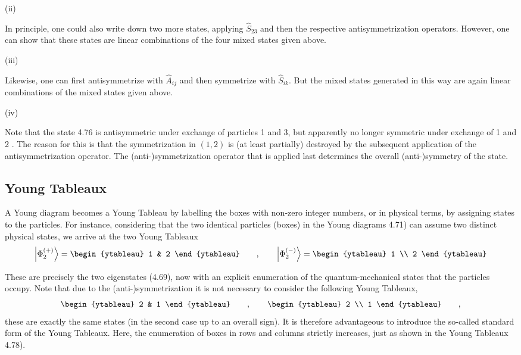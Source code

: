 \documentclass[10pt, letterpaper]{article}
\begin{document}
(ii) 

In principle, one could also write down two more states, applying $\hat{S}_{23}$ and then the respective antisymmetrization operators. However, one can show that these states are linear combinations of the four mixed states given above.


(iii) 

Likewise, one can first antisymmetrize with $\hat{A}_{i j}$ and then symmetrize with $\hat{S}_{i k}$. But the mixed states generated in this way are again linear combinations of the mixed states given above.

(iv) 

Note that the state 4.76 is antisymmetric under exchange of particles 1 and 3, but apparently no longer symmetric under exchange of 1 and 2 . The reason for this is that the symmetrization in $(1,2)$ is (at least partially) destroyed by the subsequent application of the antisymmetrization operator. The (anti-)symmetrization operator that is applied last determines the overall (anti-)symmetry of the state.




\subsection{Young Tableaux}
A Young diagram becomes a Young Tableau by labelling the boxes with non-zero integer numbers, or in physical terms, by assigning states to the particles. For instance, considering that the two identical particles (boxes) in the Young diagrams 4.71) can assume two distinct physical states, we arrive at the two Young Tableaux
\[
\left| \Phi_2^{(+)} \right\rangle =
\begin{ytableau}
1 & 2
\end{ytableau}
\qquad , \qquad
\left| \Phi_2^{(-)} \right\rangle =
\begin{ytableau}
1 \\
2
\end{ytableau}
\]

These are precisely the two eigenstates (4.69), now with an explicit enumeration of the quantum-mechanical states that the particles occupy. Note that due to the (anti-)symmetrization it is not necessary to consider the following Young Tableaux,
\[
\begin{ytableau}
2 & 1
\end{ytableau}
\qquad , \qquad
\begin{ytableau}
2 \\
1
\end{ytableau}
\qquad ,
\]
these are exactly the same states (in the second case up to an overall sign). It is therefore advantageous to introduce the so-called standard form of the Young Tableaux. Here, the enumeration of boxes in rows and columns strictly increases, just as shown in the Young Tableaux 4.78).
\end{document}
